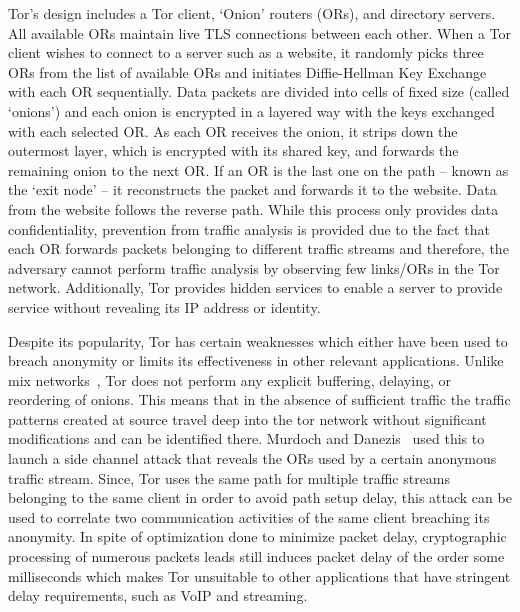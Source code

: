 \documentclass[conference]{IEEEtran}
\begin{document}
Tor's design includes a Tor client, `Onion' routers (ORs), and directory servers. All available ORs maintain live TLS connections between each other. When a Tor client wishes to connect to a server such as a website, it randomly picks three ORs from the list of available ORs and initiates Diffie-Hellman Key Exchange with each OR sequentially. Data packets are divided into cells of fixed size (called `onions') and each onion is encrypted in a layered way with the keys exchanged with each selected OR. As each OR receives the onion, it strips down the outermost layer, which is encrypted with its shared key, and forwards the remaining onion to the next OR. If an OR is the last one on the path -- known as the `exit node' -- it reconstructs the packet and forwards it to the website. Data from the website follows the reverse path. While this process only provides data confidentiality, prevention from traffic analysis is provided due to the fact that each OR forwards packets belonging to different traffic streams and therefore, the adversary cannot perform traffic analysis by observing few links/ORs in the Tor network. Additionally, Tor provides hidden services to enable a server to provide service without revealing its IP address or identity.

Despite its popularity, Tor has certain weaknesses which either have been used to breach anonymity or limits its effectiveness in other relevant applications. Unlike mix networks~\cite{Chaum:1981:UEM:358549.358563}, Tor does not perform any explicit buffering, delaying, or reordering of onions. This means that in the absence of sufficient traffic the traffic patterns created at source travel deep into the tor network without significant modifications and can be identified there. Murdoch and Danezis~\cite{Murdoch:2005:LTA:1058433.1059390} used this to launch a side channel attack that reveals the ORs used by a certain anonymous traffic stream. Since, Tor uses the same path for multiple traffic streams belonging to the same client in order to avoid path setup delay, this attack can be used to correlate two communication activities of the same client breaching its anonymity. In spite of optimization done to minimize packet delay, cryptographic processing of numerous packets leads still induces packet delay of the order some milliseconds which makes Tor unsuitable to other applications that have stringent  delay requirements, such as VoIP and streaming. 
\end{document}
